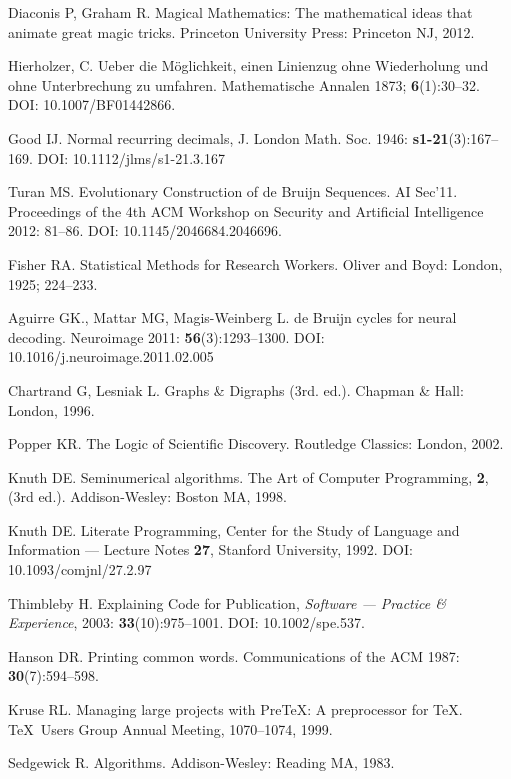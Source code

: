 \documentclass[prodmode,acmtecs]{acmsmall} %
\begin{document}
{\begin{thebibliography}{00}
Diaconis P, Graham R. Magical Mathematics: The mathematical ideas that animate great magic tricks. Princeton University Press: Princeton NJ, 2012.


Hierholzer, C. Ueber die M\"oglichkeit, einen Linienzug ohne Wiederholung und ohne Unterbrechung zu umfahren. Mathematische Annalen 1873; \textbf{6}(1):30--32. DOI: 10.1007/BF01442866.


Good IJ. Normal recurring decimals, J. London Math. Soc. 1946: \textbf{s1-21}(3):167--169. DOI: 10.1112/jlms/s1-21.3.167

Turan MS. Evolutionary Construction of de Bruijn Sequences. AI Sec'11. Proceedings of the 4th ACM Workshop on Security and Artificial Intelligence 2012: 81--86. DOI: 10.1145/2046684.2046696.

Fisher RA. Statistical Methods for Research Workers. Oliver and Boyd: London, 1925; 224--233.

Aguirre GK., Mattar MG, Magis-Weinberg L. de Bruijn cycles for neural decoding. Neuroimage 2011: \textbf{56}(3):1293--1300. DOI: 10.1016/j.neuroimage.2011.02.005


Chartrand G, Lesniak L. Graphs \& Digraphs (3rd. ed.). Chapman \& Hall: London, 1996.

Popper KR. The Logic of Scientific Discovery. Routledge Classics: London, 2002.

Knuth DE. Seminumerical algorithms. The Art of Computer Programming, \textbf{2}, (3rd ed.). Addison-Wesley: Boston MA, 1998.

Knuth DE. Literate Programming, Center for the Study of Language and Information --- Lecture Notes \textbf{27}, Stanford University, 1992. DOI: 10.1093/comjnl/27.2.97

Thimbleby H. Explaining Code for Publication, \emph{Software --- Practice {\&} Experience}, 2003: \textbf{33}(10):975--1001. DOI: 10.1002/spe.537.

Hanson DR. Printing common words. Communications of the ACM 1987: \textbf{30}(7):594--598.

Kruse RL. Managing large projects with Pre\TeX: A preprocessor for \TeX. \TeX\ Users Group Annual Meeting, 1070--1074, 1999.

Sedgewick R. Algorithms. Addison-Wesley: Reading MA, 1983.

\end{thebibliography}}
\end{document}
